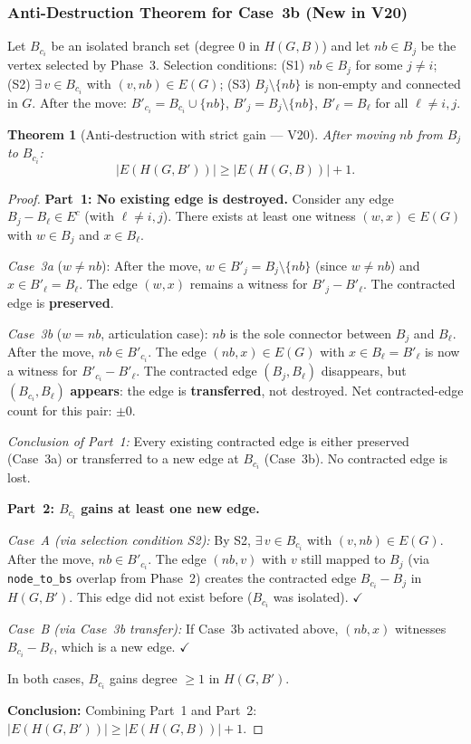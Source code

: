 \documentclass[12pt,a4paper]{article}
\newtheorem{theorem}{Theorem}[section]
\theoremstyle{definition}
\begin{document}
\subsubsection*{Anti-Destruction Theorem for Case~3b (New in V20)}

Let $B_{c_i}$ be an isolated branch set (degree 0 in $H(G,B)$) and let
$nb \in B_j$ be the vertex selected by Phase~3.
Selection conditions: (S1) $nb \in B_j$ for some $j \neq i$; (S2)
$\exists\, v \in B_{c_i}$ with $(v,nb) \in E(G)$; (S3) $B_j \setminus
\{nb\}$ is non-empty and connected in $G$.
After the move: $B'_{c_i} = B_{c_i} \cup \{nb\}$,
$B'_j = B_j \setminus \{nb\}$, $B'_\ell = B_\ell$ for all $\ell \neq
i,j$.

\begin{theorem}[Anti-destruction with strict gain --- V20]
\label{thm:antidestruction}
After moving $nb$ from $B_j$ to $B_{c_i}$:
\[
|E(H(G,B'))| \geq |E(H(G,B))| + 1.
\]
\end{theorem}

\begin{proof}
\textbf{Part~1: No existing edge is destroyed.}
Consider any edge $B_j - B_\ell \in E^c$ (with $\ell \neq i,j$).
There exists at least one witness $(w,x) \in E(G)$ with $w \in B_j$
and $x \in B_\ell$.

\textit{Case~3a} ($w \neq nb$): After the move, $w \in B'_j = B_j
\setminus \{nb\}$ (since $w \neq nb$) and $x \in B'_\ell = B_\ell$.
The edge $(w,x)$ remains a witness for $B'_j - B'_\ell$.
The contracted edge is \textbf{preserved}.

\textit{Case~3b} ($w = nb$, articulation case): $nb$ is the sole connector
between $B_j$ and $B_\ell$. After the move, $nb \in B'_{c_i}$. The edge
$(nb, x) \in E(G)$ with $x \in B_\ell = B'_\ell$ is now a witness for
$B'_{c_i} - B'_\ell$. The contracted edge $(B_j, B_\ell)$ disappears,
but $(B_{c_i}, B_\ell)$ \textbf{appears}: the edge is
\textbf{transferred}, not destroyed. Net contracted-edge count for this
pair: $\pm 0$.

\textit{Conclusion of Part~1:} Every existing contracted edge is either
preserved (Case~3a) or transferred to a new edge at $B_{c_i}$ (Case~3b).
No contracted edge is lost.

\textbf{Part~2: $B_{c_i}$ gains at least one new edge.}

\textit{Case~A (via selection condition S2):} By S2, $\exists\, v \in
B_{c_i}$ with $(v, nb) \in E(G)$.
After the move, $nb \in B'_{c_i}$. The edge $(nb, v)$ with $v$ still
mapped to $B_j$ (via \texttt{node\_to\_bs} overlap from Phase~2) creates
the contracted edge $B_{c_i} - B_j$ in $H(G,B')$. This edge did not
exist before ($B_{c_i}$ was isolated). $\checkmark$

\textit{Case~B (via Case~3b transfer):} If Case~3b activated above,
$(nb, x)$ witnesses $B_{c_i} - B_\ell$, which is a new edge. $\checkmark$

In both cases, $B_{c_i}$ gains degree $\geq 1$ in $H(G,B')$.

\textbf{Conclusion:} Combining Part~1 and Part~2:
$|E(H(G,B'))| \geq |E(H(G,B))| + 1$.
\end{proof}
\end{document}
